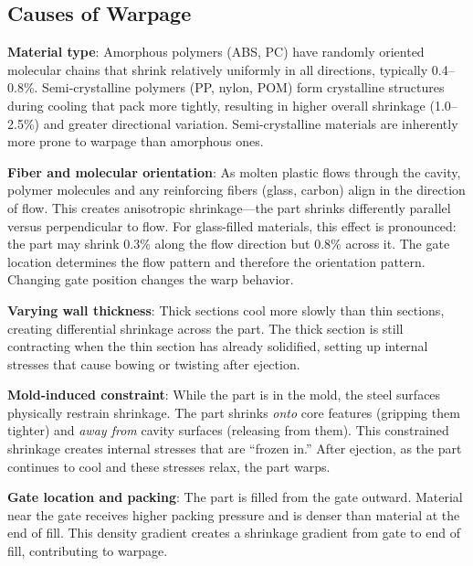 \documentclass[11pt,letterpaper,twoside,openany]{book}
\begin{document}
\subsection{Causes of Warpage}

\textbf{Material type}: Amorphous polymers (ABS, PC) have randomly oriented molecular chains that shrink relatively uniformly in all directions, typically 0.4--0.8\%. Semi-crystalline polymers (PP, nylon, POM) form crystalline structures during cooling that pack more tightly, resulting in higher overall shrinkage (1.0--2.5\%) and greater directional variation. Semi-crystalline materials are inherently more prone to warpage than amorphous ones.

\textbf{Fiber and molecular orientation}: As molten plastic flows through the cavity, polymer molecules and any reinforcing fibers (glass, carbon) align in the direction of flow. This creates anisotropic shrinkage---the part shrinks differently parallel versus perpendicular to flow. For glass-filled materials, this effect is pronounced: the part may shrink 0.3\% along the flow direction but 0.8\% across it. The gate location determines the flow pattern and therefore the orientation pattern. Changing gate position changes the warp behavior.

\textbf{Varying wall thickness}: Thick sections cool more slowly than thin sections, creating differential shrinkage across the part. The thick section is still contracting when the thin section has already solidified, setting up internal stresses that cause bowing or twisting after ejection.

\textbf{Mold-induced constraint}: While the part is in the mold, the steel surfaces physically restrain shrinkage. The part shrinks \emph{onto} core features (gripping them tighter) and \emph{away from} cavity surfaces (releasing from them). This constrained shrinkage creates internal stresses that are ``frozen in.'' After ejection, as the part continues to cool and these stresses relax, the part warps.

\textbf{Gate location and packing}: The part is filled from the gate outward. Material near the gate receives higher packing pressure and is denser than material at the end of fill. This density gradient creates a shrinkage gradient from gate to end of fill, contributing to warpage.
\end{document}
